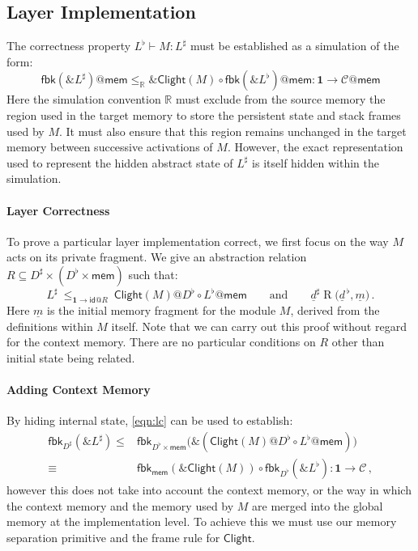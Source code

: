 \documentclass[acmsmall,screen,review,anonymous]{acmart}
\newcommand{\kw}[1]{\ensuremath{ \mathsf{#1} }}
\newcommand{\intl}[1]{\underline{#1}}
\newcommand{\Clight}{\ensuremath{ \mathsf{Clight} }}
\begin{document}
{
\color{gray}
\subsection{Layer Implementation} %

The correctness property $L^\flat \vdash M : L^\sharp$
must be established as a simulation of the form:
\[
  \kw{fbk}(\&L^\sharp)@\kw{mem}
  \le_\mathbb{R}
  \&\Clight(M) \circ \kw{fbk}(\&L^\flat)@\kw{mem}
  :
  \mathbf{1} \rightarrow \mathcal{C}@\kw{mem}
\]
Here the simulation convention $\mathbb{R}$
must exclude from the source memory
the region used in the target memory
to store the persistent state and stack frames used by $M$.
It must also ensure that
this region remains unchanged in the target memory
between successive activations of $M$.
However,
the exact representation used
to represent the hidden abstract state of $L^\sharp$
is itself hidden within the simulation.

\paragraph{Layer Correctness}

To prove a particular layer implementation correct,
we first focus on the way $M$ acts on its private fragment.
We give an abstraction relation
$R \subseteq D^\sharp \times (D^\flat \times \kw{mem})$
such that:
\begin{equation}
  L^\sharp
  \:\le_{\mathbf{1} \rightarrow \kw{id}@R}\:
  \Clight(M)@D^\flat \circ L^\flat@\kw{mem}
  \qquad \text{and} \qquad
  \intl{d}^\sharp \mathrel{R} \big( \intl{d}^{\,\flat}, \intl{m} \big)
  \,.
  \label{eqn:lc}
\end{equation}
Here $\intl{m}$ is the initial memory fragment for the module $M$,
derived from the definitions within $M$ itself.
Note that we can carry out this proof without regard for the context memory.
There are no particular conditions on $R$ other than
initial state being related.

\paragraph{Adding Context Memory}

By hiding internal state,
\autoref{eqn:lc} can be used to establish:
\begin{align*}
  \kw{fbk}_{D^\sharp}(\&L^\sharp) \le {} &
  \kw{fbk}_{D^\flat \times \kw{mem}} \big(
    \&(\Clight(M)@D^\flat \circ L^\flat@\kw{mem})
    \big) \\ \equiv {} &
  \kw{fbk}_\kw{mem}(\&\Clight(M)) \circ \kw{fbk}_{D^\flat}(\&L^\flat)
  : \mathbf{1} \rightarrow \mathcal{C}
  \,,
\end{align*}
however this does not take into account the context memory,
or the way in which the context memory and the memory used by $M$
are merged into the global memory
at the implementation level.
To achieve this we must use our memory separation primitive
and the frame rule for $\Clight$.
}
\end{document}
